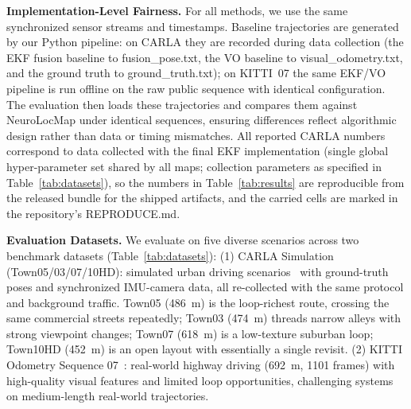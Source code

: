 \textbf{Implementation-Level Fairness.} For all methods, we use the same synchronized sensor streams and timestamps. Baseline trajectories are generated by our Python pipeline: on CARLA they are recorded during data collection (the EKF fusion baseline to fusion\_pose.txt, the VO baseline to visual\_odometry.txt, and the ground truth to ground\_truth.txt); on KITTI~07 the same EKF/VO pipeline is run offline on the raw public sequence with identical configuration. The evaluation then loads these trajectories and compares them against NeuroLocMap under identical sequences, ensuring differences reflect al\-go\-rith\-mic design rather than data or timing mismatches. All reported CARLA numbers correspond to data collected with the final EKF implementation (single global hyper-parameter set shared by all maps; collection parameters as specified in Table~\ref{tab:datasets}), so the numbers in Table~\ref{tab:results} are reproducible from the released bundle for the shipped artifacts, and the carried cells are marked in the repository's REPRODUCE.md.

\textbf{Evaluation Datasets.} We evaluate on five diverse scenarios across two benchmark datasets (Table~\ref{tab:datasets}): (1) CARLA Simulation (Town05/03/07/10HD): simulated urban driving scenarios~\cite{dosovitskiy2017carla} with ground-truth poses and synchronized IMU-camera data, all re-collected with the same protocol and background traffic. Town05 (486~m) is the loop-richest route, crossing the same commercial streets repeatedly; Town03 (474~m) threads narrow alleys with strong viewpoint changes; Town07 (618~m) is a low-texture suburban loop; Town10HD (452~m) is an open layout with essentially a single revisit. (2) KITTI Odometry Sequence 07~\cite{geiger2012kitti}: real-world highway driving (692~m, 1101 frames) with high-quality visual features and limited loop opportunities, challenging systems on medium-length real-world trajectories.

